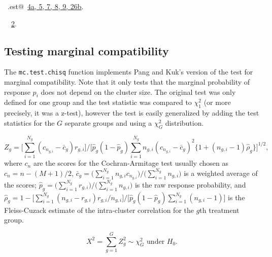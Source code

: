 \documentclass[reqno]{amsart}
\renewcommand{\NWlink}[2]{\hyperlink{#1}{#2}}
\begin{document}
\begin{flushleft}
\begin{list}{}{\setlength{\itemsep}{-\parsep}\setlength{\itemindent}{-\leftmargin}}
\item \NWtxtIdentsDefed\nobreak\  \verb@mc.est@\nobreak\ \NWlink{nuweb4a}{4a}\NWlink{nuweb5}{, 5}\NWlink{nuweb7}{, 7}\NWlink{nuweb8}{, 8}\NWlink{nuweb9}{, 9}\NWlink{nuweb26b}{, 26b}.\item \NWtxtIdentsUsed\nobreak\  \verb@ReprodEstimates@\nobreak\ \NWlink{nuweb2}{2}.
\item{}
\end{list}
\vspace{4ex}
\end{flushleft}
\subsection{Testing marginal compatibility}
The \texttt{mc.test.chisq} function implements Pang and Kuk's version of
the test for marginal compatibility. Note that it only tests that the marginal probability of 
response $p_i$ does not depend on the cluster size. The original test was only
defined for one group and the test statistic was compared to $\chi^2_1$ (or more
precisely, it was a z-test), however the test is easily generalized by adding 
the test statistics for the $G$ separate groups and using a $\chi^2_G$ distribution.

\begin{equation}
Z_g = \Big[\sum_{i=1}^{N_g} (c_{n_{g,i}} - \bar{c}_g) r_{g,i}\Big] \bigg/
  \Big[\hat{p}_g(1-\hat{p}_g)\sum_{i=1}^{N_g}n_{g,i}(c_{n_{g,i}} - \bar{c}_g)^2 \{1+(n_{g,i}-1)\hat{\rho}_g\}\Big]^{1/2},
\end{equation}
where $c_n$ are the scores for the Cochran-Armitage test usually chosen as $c_n=n-(M+1)/2$, 
$\bar{c}_g=\big(\sum_{i=1}^{N_g}n_{g,i}c_{n_{g,i}}\big) \big/ \big(\sum_{i=1}^{N_g}n_{g,i}\big)$ is a weighted
average of the scores; $\hat{p}_g=\big(\sum_{i=1}^{N_g}r_{g,i}\big) \big/ \big(\sum_{i=1}^{N_g}n_{g,i}\big)$ 
is the raw response probability, and 
$\hat{\rho}_g=1-\big[\sum_{i=1}^{N_g}(n_{g,i}-r_{g,i})r_{g,i}/n_{g,i}\big] \big/ 
\big[\hat{p}_g(1-\hat{p}_g)\sum_{i=1}^{N_g}(n_{g,i}-1)\big]$ is the Fleiss-Cuzack estimate of the intra-cluster
correlation for the $g$th treatment group. 

\begin{equation}
X^2=\sum_{g=1}^G Z_g^2 \sim \chi^2_G \text{ under }H_0.
\end{equation}
\end{document}
